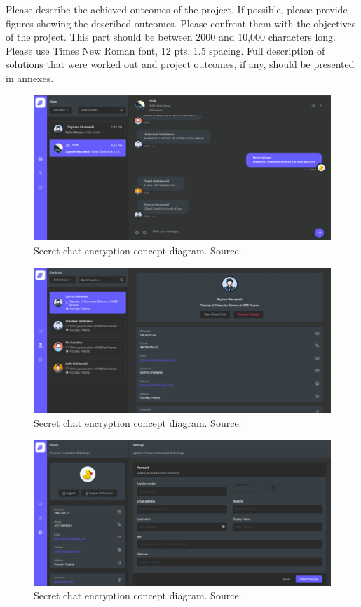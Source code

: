 Please describe the achieved outcomes of the project.
If possible, please provide figures showing the described outcomes.
Please confront them with the objectives of the project.
This part should be between 2000 and 10,000 characters long.
Please use Times New Roman font, 12 pts, 1.5 spacing.
Full description of solutions that were worked out and project outcomes, if any, should be presented in annexes.
\begin{figure}[H]
    \centering
    \includegraphics[width=1\textwidth]{Pictures/Messenger-1}
    \caption{Secret chat encryption concept diagram. Source: }\label{fig:figure5}
\end{figure}

\begin{figure}[H]
    \centering
    \includegraphics[width=1\textwidth]{Pictures/Messenger-2}
    \caption{Secret chat encryption concept diagram. Source: }\label{fig:figure10}
\end{figure}

\begin{figure}[H]
    \centering
    \includegraphics[width=1\textwidth]{Pictures/Messenger-3}
    \caption{Secret chat encryption concept diagram. Source: }\label{fig:figure11}
\end{figure}